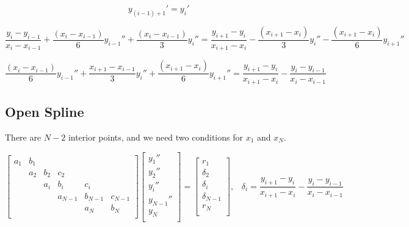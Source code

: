 \documentclass[aps,onecolumn,11pt]{revtex4}
\begin{document}
$$
	y_{(i-1)+1}' = y_i'
$$
	
\begin{equation}
		\dfrac{y_{i}-y_{i-1}}{x_{i}-x_{i-1}} + \dfrac{(x_{i} - x_{i-1})}{6} y_{i-1}'' + \dfrac{(x_{i} - x_{i-1})}{3} y_{i}''
		=
		\dfrac{y_{i+1}-y_{i}}{x_{i+1}-x_{i}} - \dfrac{(x_{i+1} - x_i)}{3} y_i'' - \dfrac{(x_{i+1} - x_i)}{6} y_{i+1}''
\end{equation}
	
\begin{equation}
	\dfrac{(x_{i} - x_{i-1})}{6} y_{i-1}'' + \dfrac{x_{i+1}-x_{i-1}}{3} y_i''+ \dfrac{(x_{i+1} - x_i)}{6} y_{i+1}'' = \dfrac{y_{i+1}-y_{i}}{x_{i+1}-x_{i}} - \dfrac{y_{i}-y_{i-1}}{x_{i}-x_{i-1}}
\end{equation}	
	
\subsection{Open Spline}
There are $N-2$ interior points, and we need two conditions for $x_1$ and $x_N$.

\begin{equation}
\begin{bmatrix}
a_1  & b_1 &     &         &         &         \\
     & a_2 & b_2 & c_2     &         &         \\
     &     & a_i & b_i     & c_i     &         \\
     &     &     & a_{N-1} & b_{N-1} & c_{N-1} \\
     &     &     &         &   a_N   & b_N     \\
\end{bmatrix}
\begin{bmatrix}
	y_1''\\
	y_2''\\
	y_i''\\
	y_{N-1}''\\
	y_N\\
\end{bmatrix}
 = 
 \begin{bmatrix}
 	r_1\\
	\delta_2\\
	\delta_i\\
	\delta_{N-1}\\
	r_N\\
 \end{bmatrix},
 \;\;\;\delta_i=\dfrac{y_{i+1}-y_{i}}{x_{i+1}-x_{i}} - \dfrac{y_{i}-y_{i-1}}{x_{i}-x_{i-1}}
\end{equation}


	
	
\end{document}

